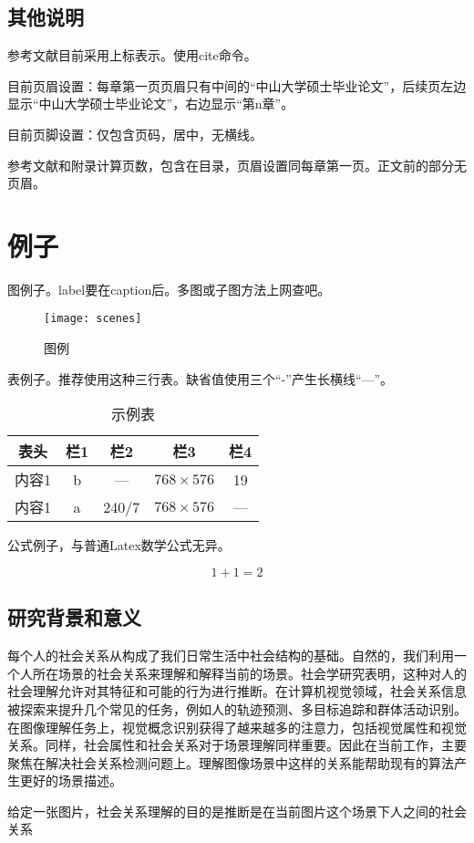 \subsection{其他说明}
\label{sec:setting}

参考文献\cite{wu2013online}目前采用上标表示。使用cite命令。

目前页眉设置：每章第一页页眉只有中间的“中山大学硕士毕业论文”，后续页左边显示“中山大学硕士毕业论文”，右边显示“第n章”。

目前页脚设置：仅包含页码，居中，无横线。

参考文献和附录计算页数，包含在目录，页眉设置同每章第一页。正文前的部分无页眉。

\section{例子}
\label{sec:examples}

图例子。label要在caption后。多图或子图方法上网查吧。

\begin{figure}[!t]
	\centering
	\texttt{[image: scenes]}
	\caption{图例}
	\label{fig:scenes}
\end{figure}

表例子。推荐使用这种三行表。缺省值使用三个“-”产生长横线“---”。

\begin{table}[!t]
\caption{示例表}
\label{tab:eg}
\vspace{0.5em}
\centering
\wuhao
	\begin{tabular}{ccccc}
	\toprule[1.5pt]
	表头 & 栏1 & 栏2 & 栏3 & 栏4 \\
	\midrule[1pt]
	内容1 & b & --- & $768 \times 576$ & 19 \\
	内容1 & a & 240/7 & $768 \times 576$ & --- \\
	\bottomrule[1.5pt]
	\end{tabular}
\end{table}

公式例子，与普通Latex数学公式无异。

\begin{equation}
1+1=2
\end{equation}

\subsection{研究背景和意义}

每个人的社会关系从构成了我们日常生活中社会结构的基础。自然的，我们利用一个人所在场景的社会关系来理解和解释当前的场景。社会学研究表明，这种对人的社会理解允许对其特征和可能的行为进行推断。在计算机视觉领域，社会关系信息被探索来提升几个常见的任务，例如人的轨迹预测\cite{kim2015brvo,robicquet2016learning}、多目标追踪\cite{chen2012discovering,qin2012improving}和群体活动识别\cite{direkoǧlu2012team,lan2012social,lan2012discriminative}。在图像理解任务上，视觉概念识别获得了越来越多的注意力，包括视觉属性和视觉关系\cite{lu2016visual}。同样，社会属性和社会关系\cite{wang2010seeing}对于场景理解同样重要。因此在当前工作，主要聚焦在解决社会关系检测问题上。理解图像场景中这样的关系能帮助现有的算法产生更好的场景描述。

给定一张图片，社会关系理解的目的是推断是在当前图片这个场景下人之间的社会关系
